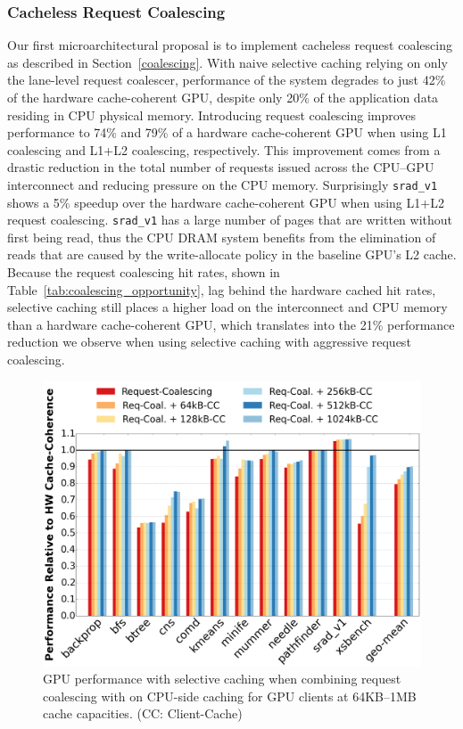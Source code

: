\subsubsection{Cacheless Request Coalescing}
\label{mshrresults}
Our first microarchitectural proposal is to implement cacheless request coalescing as described in Section~\ref{coalescing}.
With naive selective caching relying on only the lane-level request coalescer, performance of the system degrades 
to just 42\% of the hardware cache-coherent GPU, despite only 20\% of the application data residing in CPU physical memory.  
Introducing request coalescing improves performance to 74\% and 79\% of a
hardware cache-coherent GPU
when using L1 coalescing and L1+L2 coalescing, respectively.  This improvement comes from
a drastic reduction in the total number of requests issued across the CPU--GPU
interconnect and reducing pressure on the CPU memory. Surprisingly \texttt{srad\_v1} shows
a 5\% speedup over the hardware cache-coherent GPU when using L1+L2 request coalescing. \texttt{srad\_v1} has 
a large number of pages
that are written without first being read, thus the CPU DRAM system benefits from the elimination of reads that are caused
by the write-allocate policy in the baseline GPU's L2 cache.
Because the request coalescing hit rates, shown in
Table~\ref{tab:coalescing_opportunity}, lag behind the hardware cached hit rates,
selective caching still places a higher load on the interconnect and CPU memory
than a hardware cache-coherent GPU, which translates
into the 21\% performance reduction we observe when using selective caching with aggressive request coalescing.

\begin{figure}[t]
\includegraphics[width=1.0\columnwidth]{hpca2016/figures/unconstrainedperformanceMshrMCCache.png}
\caption{GPU performance with selective caching when combining request coalescing with on CPU-side
caching for GPU clients at 64KB--1MB cache capacities. (CC: Client-Cache)}
\label{fig:mccache}
\end{figure}

